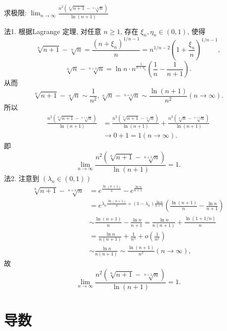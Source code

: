\documentclass[color=green,titlestyle=hang]{elegantbook}%
\begin{document}
\begin{exercise}
求极限: $\lim_{n\to\infty}\frac{n^2(\sqrt[n]{n+1}-\sqrt[n+1]{n})}{\ln (n+1)}$
\end{exercise}\begin{solution}
法1. 根据Lagrange 定理, 对任意 $n\geq 1$, 存在 $\xi_n,\eta_n\in (0,1)$, 使得
\[\sqrt[n]{n+1}-\sqrt[n]{n}=\frac{(n+\xi_n)^{1/n-1}}{n}=n^{1/n-2}(1+\frac{\xi_n}{n})^{1/n-1},\]
\[\sqrt[n]{n}-\sqrt[n+1]{n}=\ln n\cdot n^{\frac{1}{n+\eta_n}}\left(\frac{1}{n}-\frac{1}{n+1}\right).\]
从而
\[\sqrt[n]{n+1}-\sqrt[n]{n}\sim\frac{1}{n^2}, \sqrt[n]{n}-\sqrt[n+1]{n}\sim \frac{\ln (n+1)}{n^2}(n\to\infty).\]
所以\begin{align*}
\frac{n^2(\sqrt[n]{n+1}-\sqrt[n+1]{n})}{\ln (n+1)}&=\frac{n^2(\sqrt[n]{n+1}-\sqrt[n]{n})}{\ln (n+1)} +\frac{n^2(\sqrt[n]{n}-\sqrt[n+1]{n})}{\ln(n+1)}\\
&\to 0+1=1(n\to\infty).
\end{align*}
即\[\lim_{n\to\infty}\frac{n^2(\sqrt[n]{n+1}-\sqrt[n+1]{n})}{\ln (n+1)}=1.\]
法2. 注意到 $(\lambda_n\in (0,1))$
\[\begin{array}{rl}\sqrt[n]{n+1}-\sqrt[n+1]{n}
&=e^{\frac{\ln (n+1)}{n}}-e^{\frac{\ln n}{n+1}}\\ 
&=e^{\lambda_n \frac{\ln (n+1)}{n}+(1-\lambda_n )\frac{\ln n}{n+1}} (\frac{\ln (n+1)}{n}-\frac{\ln n}{n+1})\\ 
&\sim \frac{\ln (n+1)}{n}-\frac{\ln n}{n+1}=\frac{\ln n}{n(n+1)}+\frac{\ln (1+1/n)}{n}\\ 
&=\frac{\ln n}{n(n+1)}+\frac{1}{n^2}+o\left(\frac{1}{n^2}\right)\\ 
&\sim \frac{\ln n}{n(n+1)}\sim\frac{\ln (n+1)}{n^2}(n\to\infty),\end{array}\]
故\[\lim_{n\to\infty}\frac{n^2(\sqrt[n]{n+1}-\sqrt[n+1]{n})}{\ln (n+1)}=1.\]
\end{solution}

\chapter{导数}
\end{document}

